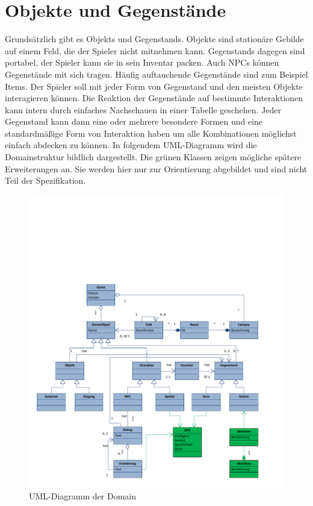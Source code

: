 \section{Objekte und Gegenstände}
Grundsätzlich gibt es \glspl{Objekt} und \glspl{Gegenstand}. Objekte sind stationäre Gebilde auf einem Feld,
die der Spieler nicht mitnehmen kann. \glspl{Gegenstand} dagegen sind portabel, der Spieler kann sie in sein
Inventar packen. Auch NPCs können Gegenstände mit sich tragen. Häufig auftauchende Gegenstände sind zum 
Beispiel \glspl{Item}. Der Spieler soll mit jeder Form von Gegenstand und den meisten Objekte interagieren
können. Die Reaktion der Gegenstände auf bestimmte Interaktionen kann intern durch einfaches Nachschauen in
einer Tabelle geschehen. Jeder Gegenstand kann dann eine oder mehrere besondere Formen und eine standardmäßige
Form von Interaktion haben um alle Kombinationen möglichst einfach abdecken zu können.
In folgendem UML-Diagramm wird die Domainstruktur bildlich dargestellt. Die grünen Klassen zeigen mögliche 
spätere Erweiterungen an. Sie werden hier nur zur Orientierung abgebildet und sind nicht Teil der 
Spezifikation.
\newpage
\begin{figure}[htb]
	\begin{center}
		\includegraphics[trim = 5mm 5mm 20mm 40mm, clip, width=14cm]{kapitel/daten/domain.pdf}
	\end{center}
	\caption{UML-Diagramm der Domain}
	\label{fig:domain_uml}
\end{figure}

